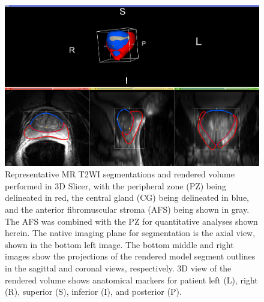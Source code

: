 \begin{figure}[htb!]
\centering
\includegraphics[width=1.0\textwidth]{tyler/MR_segs_methods.png}
\caption{Representative MR T2WI segmentations and rendered volume performed in
    3D Slicer, with the peripheral zone (PZ) being delineated in red, the
    central gland (CG) being delineated in blue, and the anterior fibromuscular
    stroma (AFS) being shown in gray.  The AFS was combined with the PZ for
    quantitative analyses shown herein.  The native imaging plane for
    segmentation is the axial view, shown in the bottom left image.  The bottom
    middle and right images show the projections of the rendered model segment
    outlines in the sagittal and coronal views, respectively. 3D view of the rendered volume shows anatomical markers for patient left (L), right (R), superior (S), inferior (I), and posterior (P).}
\label{fig:mr_segs_vol} 
\end{figure}
